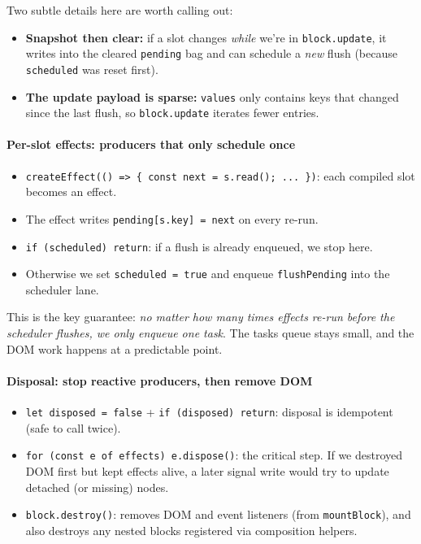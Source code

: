 Two subtle details here are worth calling out:
\begin{itemize}
  \item \textbf{Snapshot then clear:} if a slot changes \emph{while} we're in \texttt{block.update}, it writes into the cleared \texttt{pending} bag and can schedule a \emph{new} flush (because \texttt{scheduled} was reset first).
  \item \textbf{The update payload is sparse:} \texttt{values} only contains keys that changed since the last flush, so \texttt{block.update} iterates fewer entries.
\end{itemize}

\paragraph{Per-slot effects: producers that only schedule once}
\begin{itemize}
  \item \texttt{createEffect(() => \{ const next = s.read(); ... \})}: each compiled slot becomes an effect.
  \item The effect writes \texttt{pending[s.key] = next} on every re-run.
  \item \texttt{if (scheduled) return}: if a flush is already enqueued, we stop here.
  \item Otherwise we set \texttt{scheduled = true} and enqueue \texttt{flushPending} into the scheduler lane.
\end{itemize}

This is the key guarantee: \emph{no matter how many times effects re-run before the scheduler flushes, we only enqueue one task}. The tasks queue stays small, and the DOM work happens at a predictable point.

\paragraph{Disposal: stop reactive producers, then remove DOM}
\begin{itemize}
  \item \texttt{let disposed = false} + \texttt{if (disposed) return}: disposal is idempotent (safe to call twice).
  \item \texttt{for (const e of effects) e.dispose()}: the critical step. If we destroyed DOM first but kept effects alive, a later signal write would try to update detached (or missing) nodes.
  \item \texttt{block.destroy()}: removes DOM and event listeners (from \texttt{mountBlock}), and also destroys any nested blocks registered via composition helpers.
\end{itemize}

